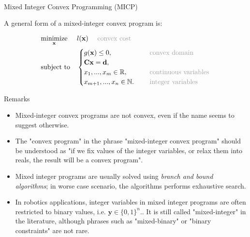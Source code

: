 \documentclass{beamer}
\begin{document}
\begin{frame}{Mixed Integer Convex Programming (MICP)}
\begin{flushleft}

A general form of a mixed-integer convex program is:

%
\begin{equation} \label{QP}
\begin{aligned}
& \underset{\mathbf{x}}{\text{minimize}}
& & 
l(\mathbf{x}) \ \ \ \ \textcolor{mylightgray}{\text{convex cost}} \\
& \text{subject to}
& & \begin{cases} 
g(\mathbf{x}) \leq 0, &\ \ \ \ \textcolor{mylightgray}{\text{convex domain}} \\ 
\mathbf{C}\mathbf{x} = 
\mathbf{d},  &\\
x_1, ..., x_m \in \mathbb{R}, &\ \ \ \ \textcolor{mylightgray}{\text{continuous variables}}\\
x_{m+1}, ..., x_n \in \mathbb{N}. &\ \ \ \ \textcolor{mylightgray}{\text{integer variables}}
\end{cases}
%
\end{aligned}
\end{equation}
 
\end{flushleft}
\end{frame}



\begin{frame}{Remarks}
\begin{flushleft}

\begin{itemize}
    \item Mixed-integer convex programs are not convex, even if the name seems to suggest otherwise. 
    \item The "convex program" in the phrase "mixed-integer convex program" should be understood as "if we fix values of the integer variables, or relax them into reals, the result will be a convex program".
    \item Mixed integer programs are usually solved using \emph{branch and bound algorithms}; in worse case scenario, the algorithms performs exhaustive search.
    \item In robotics applications, integer variables in mixed integer programs are often restricted to binary values, i.e. $\mathbf{y} \in \{0, 1\}^n.$. It is still called "mixed-integer" in the literature, although phrases such as "mixed-binary" or "binary constraints" are not rare.
\end{itemize}
 
\end{flushleft}
\end{frame}
\end{document}

